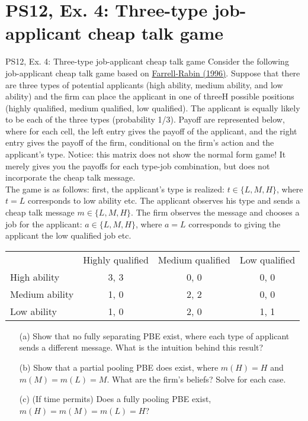 \section{PS12, Ex. 4: Three-type job-applicant cheap talk game}

\begin{frame}{PS12, Ex. 4: Three-type job-applicant cheap talk game}
    Consider the following job-applicant cheap talk game based on \href{https://www.aeaweb.org/articles?id=10.1257/jep.10.3.103}{Farrell-Rabin (1996)}. Suppose that there are three types of potential applicants (high ability, medium ability, and low ability) and the firm can place the applicant in one of threeH possible positions (highly qualified, medium qualified, low qualified). The applicant is equally likely to be each of the three types (probability 1/3). Payoff are represented below, where for each cell, the left entry gives the payoff of the applicant, and the right entry gives the payoff of the firm, conditional on the firm’s action and the applicant’s type. Notice: this matrix does not show the normal form game! It merely gives you the payoffs for each type-job combination, but does not incorporate the cheap talk message.\\
    The game is as follows: first, the applicant’s type is realized: $t\in\{L,M,H\}$, where $t=L$ corresponds to low ability etc. The applicant observes his type and sends a cheap talk message $m\in\{L,M,H\}$. The firm observes the message and chooses a job for the applicant: $a\in\{L,M,H\}$, where $a=L$ corresponds to giving the applicant the low qualified job etc.\vspace{-14pt}
    \begin{table}
      \begin{tabular}{l|c|c|c|}
          \multicolumn{1}{c}{} & \multicolumn{1}{c}{Highly qualified} & \multicolumn{1}{c}{Medium qualified} & \multicolumn{1}{c}{Low qualified} \\\cline{2-4}
          High ability   & 3, 3 & 0, 0 & 0, 0 \\\cline{2-4}
          Medium ability & 1, 0 & 2, 2 & 0, 0 \\\cline{2-4}
          Low ability    & 1, 0 & 2, 0 & 1, 1 \\\cline{2-4}
      \end{tabular}
    \end{table}\vspace{-8pt}
    \begin{itemize}
      \item[(a)] Show that no fully separating PBE exist, where each type of applicant sends a different message. What is the intuition behind this result?
      \item[(b)] Show that a partial pooling PBE does exist, where $m(H)=H$ and $m(M)=m(L)=M$. What are the firm's beliefs? Solve for each case.
      \item[(c)] (If time permits) Does a fully pooling PBE exist, $m(H)=m(M)=m(L)=H$?
    \end{itemize}\vspace{-6pt}
    \vfill\null
\end{frame}



